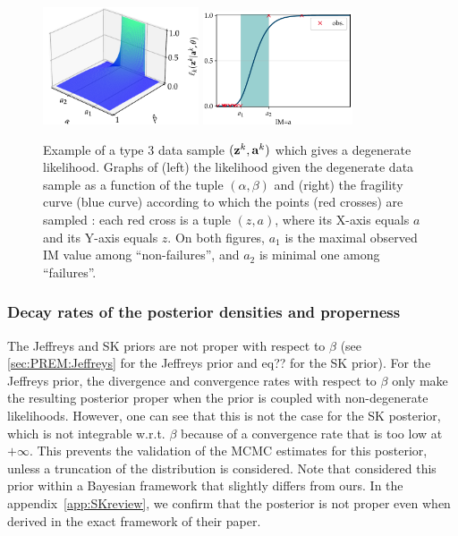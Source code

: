 \begin{figure}[h]
    \centering
    \includegraphics[width=4.6cm]{figures/PREM/likelihood_degen.pdf}\qquad
    \includegraphics[width=4.44cm]{figures/PREM/degeneracy.pdf}
    \caption{{Example of a type 3 data sample $(\mathbf{z}^k,\mathbf{a}^k)$ which gives a degenerate likelihood. Graphs of (left) the likelihood given the degenerate data sample as a function of the tuple $(\alpha,\beta)$ and (right) the fragility curve (blue curve) according to which the points (red crosses) are sampled : each red cross is a tuple $(z,a)$, where its X-axis equals $a$ and its Y-axis equals $z$.}
    On both figures, $a_1$ is the maximal observed IM value among ``non-failures'', and $a_2$ is minimal one among ``failures''.}
    \label{fig:degenerate-frag}
\end{figure}




\subsubsection{Decay rates of the posterior densities and properness}


The Jeffreys and SK priors are not proper with respect to $\beta$ (see \cref{sec:PREM:Jeffreys} for the Jeffreys prior and eq?? for the SK prior). For the Jeffreys prior, the divergence and convergence rates with respect to $\beta$ only make the resulting posterior proper when the prior is coupled with non-degenerate likelihoods. 
 However, one can see that this is not the case for the SK posterior, which is not integrable w.r.t. $\beta$ because of a convergence rate that is too low at $+\infty$. This prevents the validation of the MCMC estimates for this posterior, unless a truncation of the distribution is considered. %
 Note that \citet{straub_improved_2008} considered this prior within a Bayesian framework that slightly differs from ours. In the appendix~\ref{app:SKreview}, we confirm that the posterior is not proper even when derived in the exact framework of their paper. %



